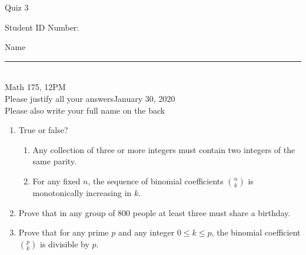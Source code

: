 \documentclass[12pt]{article}
\begin{document}
\begin{flushleft} 
\centerline{\LARGE{Quiz 3}} 
\vspace{5 mm}
{Student ID Number:}\hfill  
{Name \rule {2 in}{0.01in}}\\
Math 175, 12PM
\\
{Please justify all your answers}\hfill {January 30, 2020}
\\
{Please also write your full name on the back} 

\medskip
\end{flushleft}

\begin{enumerate}
	\item True or false?
	\begin{enumerate}
		\item Any collection of three or more integers must contain two integers of the same parity.
		\item For any fixed $n$, the sequence of binomial coefficients $\binom{n}{k}$ is monotonically increasing in $k$.
	\end{enumerate}
	\item Prove that in any group of 800 people at least three must share a birthday.
	\vfill
	\item Prove that for any prime $p$ and any integer $0\leq k\leq p$, the binomial coefficient $\binom{p}{k}$ is divisible by $p$.
	\vfill
\end{enumerate}

\end{document}
